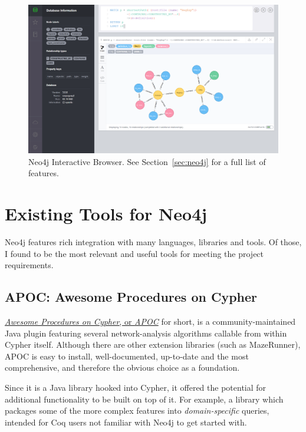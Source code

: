 \begin{figure}[tbp]

\includegraphics[width=\textwidth]{img/Neo4j_Browser.png}
\caption{Neo4j Interactive Browser. See Section~\ref{sec:neo4j} for a full
list of features.}\label{fig:neo4jbrowser}

\end{figure}

\section{Existing Tools for Neo4j}\label{subsec:existtoolsneo4j}

Neo4j features rich integration with many languages, libraries and tools.  Of
those, I found to be the most relevant and useful tools for meeting the project
requirements.

\subsection{APOC: Awesome Procedures on Cypher}

\href{http://github.com/neo4j-contrib/neo4j-apoc-procedures}{\emph{Awesome
Procedures on Cypher}, or \emph{APOC}} for short, is a community-maintained Java
plugin featuring several network-analysis algorithms callable from within Cypher
itself.  Although there are other extension libraries (such as MazeRunner), APOC
is easy to install, well-documented, up-to-date and the most comprehensive, and
therefore the obvious choice as a foundation.

Since it is a Java library hooked into Cypher, it offered the potential for
additional functionality to be built on top of it. For example, a library which
packages some of the more complex features into \emph{domain-specific} queries,
intended for Coq users not familiar with Neo4j to get started with.

